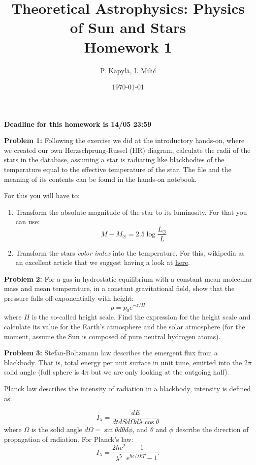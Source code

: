 \documentclass[12pt]{article}
\title{Theoretical Astrophysics: Physics of Sun and Stars\\
Homework 1}
\author{P. K\"{a}pyl\"{a}, I. Mili\'{c}}
\date{\today}
\begin{document}
\maketitle

\textbf{Deadline for this homework is 14/05 23:59}



{\bf Problem 1:} Following the exercise we did at the introductory hands-on, where we created our own Herzschprung-Russel (HR) diagram, calculate the radii of the stars in the database, assuming a star is radiating like blackbodies of the temperature equal to the effective temperature of the star. The file and the meaning of its contents can be found in the hands-on notebook.

For this you will have to: 
\begin{enumerate}
  \item Transform the absolute magnitude of the star to its luminosity. For that you can use: 
  \begin{equation}
  M - M_{\odot} = 2.5\log\frac{L_{\odot}}{L}
  \end{equation}

  \item Transform the stars \emph{color index} into the temperature. For this, wikipedia as an excellent article that we suggest having a look at \href{https://en.wikipedia.org/wiki/Color_index}{here}.

\end{enumerate}

{\bf Problem 2:} For a gas in hydrostatic equilibrium with a constant mean molecular mass and mean temperature, in a constant gravitational field, show that the pressure falls off exponentially with height: 
\begin{equation}
p = p_0 e^{-z/H}
\end{equation}
where $H$ is the so-called height scale. Find the expression for the height scale and calculate its value for the Earth's atmosphere and the solar atmosphere (for the moment, assume the Sun is composed of pure neutral hydrogen atoms).

{\bf Problem 3:} Stefan-Boltzmann law describes the emergent flux from a blackbody. That is, total energy per unit surface in unit time, emitted into the $2\pi$ solid angle (full sphere is $4\pi$ but we are only looking at the outgoing half).

Planck law describes the intensity of radiation in a blackbody, intensity is defined as: 

\begin{equation}
I_\lambda = \frac{dE}{dt dS d\Omega d\lambda \cos \theta}
\end{equation}
where $\Omega$ is the solid angle $d\Omega = \sin \theta d\theta d\phi$, and $\theta$ and $\phi$ describe the direction of propagation of radiation. For Planck's law:
\begin{equation}
I_\lambda = \frac{2hc^2}{\lambda^5} \frac{1}{e^{hc/\lambda k T} - 1}.
\end{equation}
\end{document}
